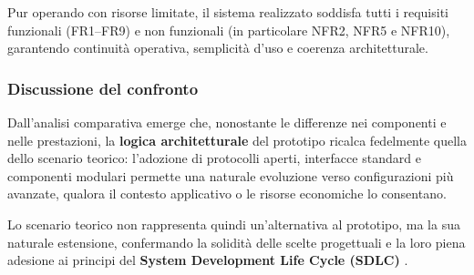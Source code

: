 Pur operando con risorse limitate, il sistema realizzato soddisfa tutti i requisiti funzionali (FR1–FR9) e non funzionali (in particolare NFR2, NFR5 e NFR10), garantendo continuità operativa, semplicità d’uso e coerenza architetturale.

\subsubsection*{Discussione del confronto}

Dall’analisi comparativa emerge che, nonostante le differenze nei componenti e nelle prestazioni, la \textbf{logica architetturale} del prototipo ricalca fedelmente quella dello scenario teorico:
l’adozione di protocolli aperti, interfacce standard e componenti modulari permette una naturale evoluzione verso configurazioni più avanzate, qualora il contesto applicativo o le risorse economiche lo consentano.

Lo scenario teorico non rappresenta quindi un’alternativa al prototipo, ma la sua naturale estensione, confermando la solidità delle scelte progettuali e la loro piena adesione ai principi del \textbf{System Development Life Cycle (SDLC)} \cite{Pressman2019}.




